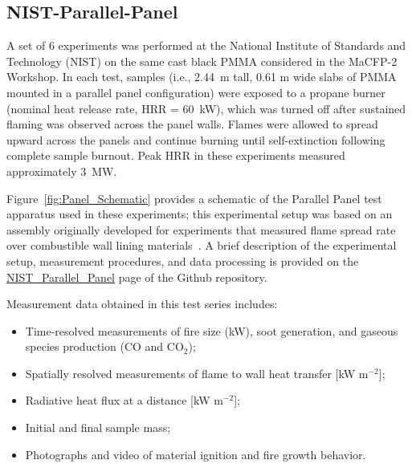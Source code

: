 \documentclass[12pt]{article}
\begin{document}
\FloatBarrier
\subsection {NIST-Parallel-Panel}
A set of 6 experiments was performed at the National Institute of Standards and Technology (NIST) on the same cast black PMMA considered in the MaCFP-2 Workshop. In each test, samples (i.e., 2.44~m tall, 0.61 m wide slabs of PMMA mounted in a parallel panel configuration) were exposed to a propane burner (nominal heat release rate, HRR = 60~kW), which was turned off after sustained flaming was observed across the panel walls. Flames were allowed to spread upward across the panels and continue burning until self-extinction following complete sample burnout. Peak HRR in these experiments measured approximately 3~MW.

Figure~\ref{fig:Panel_Schematic} provides a schematic of the Parallel Panel test apparatus used in these experiments; this experimental setup was based on an assembly originally developed for experiments that measured flame spread rate over combustible wall lining materials~\cite{Beaulieu2007Parallel}. A brief description of the experimental setup, measurement procedures, and data processing is provided on the \href{https://github.com/MaCFP/macfp-db/tree/master/Fire_Growth/NIST_Parallel_Panel}{NIST\_Parallel\_Panel} page of the Github repository.

Measurement data obtained in this test series includes:
\begin{itemize}[noitemsep]
\item Time-resolved measurements of fire size (kW), soot generation, and gaseous species production (CO and CO$_2$);
\item Spatially resolved measurements of flame to wall heat transfer [kW m$^{-2}$];
\item Radiative heat flux at a distance [kW m$^{-2}$]; 
\item Initial and final sample mass; 
\item Photographs and video of material ignition and fire growth behavior.
\end{itemize}
\end{document}
